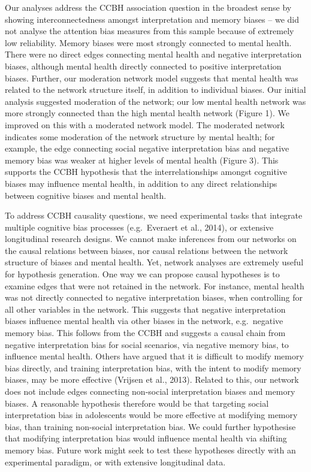 \documentclass[
  english,
  man,floatsintext]{apa6}
\begin{document}
Our analyses address the CCBH association question in the broadest sense by showing interconnectedness amongst interpretation and memory biases -- we did not analyse the attention bias measures from this sample because of extremely low reliability. Memory biases were most strongly connected to mental health. There were no direct edges connecting mental health and negative interpretation biases, although mental health directly connected to positive interpretation biases. Further, our moderation network model suggests that mental health was related to the network structure itself, in addition to individual biases. Our initial analysis suggested moderation of the network; our low mental health network was more strongly connected than the high mental health network (Figure 1). We improved on this with a moderated network model. The moderated network indicates some moderation of the network structure by mental health; for example, the edge connecting social negative interpretation bias and negative memory bias was weaker at higher levels of mental health (Figure 3). This supports the CCBH hypothesis that the interrelationships amongst cognitive biases may influence mental health, in addition to any direct relationships between cognitive biases and mental health.

To address CCBH causality questions, we need experimental tasks that integrate multiple cognitive bias processes (e.g.~Everaert et al., 2014), or extensive longitudinal research designs. We cannot make inferences from our networks on the causal relations between biases, nor causal relations between the network structure of biases and mental health. Yet, network analyses are extremely useful for hypothesis generation. One way we can propose causal hypotheses is to examine edges that were not retained in the network. For instance, mental health was not directly connected to negative interpretation biases, when controlling for all other variables in the network. This suggests that negative interpretation biases influence mental health via other biases in the network, e.g.~negative memory bias. This follows from the CCBH and suggests a causal chain from negative interpretation bias for social scenarios, via negative memory bias, to influence mental health. Others have argued that it is difficult to modify memory bias directly, and training interpretation bias, with the intent to modify memory biases, may be more effective (Vrijsen et al., 2013). Related to this, our network does not include edges connecting non-social interpretation biases and memory biases. A reasonable hypothesis therefore would be that targeting social interpretation bias in adolescents would be more effective at modifying memory bias, than training non-social interpretation bias. We could further hypothesise that modifying interpretation bias would influence mental health via shifting memory bias. Future work might seek to test these hypotheses directly with an experimental paradigm, or with extensive longitudinal data.
\end{document}
